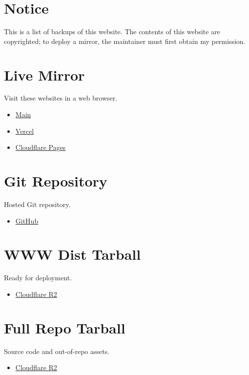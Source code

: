 




\section*{Notice}

This is a list of backups of this website.
The contents of this website are copyrighted; to deploy a mirror, the maintainer must first obtain my permission.

\section*{Live Mirror}

Visit these websites in a web browser.

\begin{itemize}
    \item \href{https://neruthes.xyz/}{Main}
    \item \href{https://neruthes.vercel.app/}{Vercel}
    \item \href{https://neruthes.pages.dev/}{Cloudflare Pages}
\end{itemize}

\section*{Git Repository}

Hosted Git repository.

\begin{itemize}
    \item \href{https://github.com/neruthes/homepage-gen3}{GitHub}
\end{itemize}

\section*{WWW Dist Tarball}

Ready for deployment.

\begin{itemize}
    \item \href{https://pub-714f8d634e8f451d9f2fe91a4debfa23.r2.dev/o/wwwdist.tar--00ef643fb4afb6610f3adbbb0ac4fc7c.tar}{Cloudflare R2}
\end{itemize}

\section*{Full Repo Tarball}

Source code and out-of-repo assets.

\begin{itemize}
    \item \href{https://pub-714f8d634e8f451d9f2fe91a4debfa23.r2.dev/o/fulltarball.tar--06e9cd96e2fe53f96483bc814e8398c4.tar}{Cloudflare R2}
\end{itemize}



